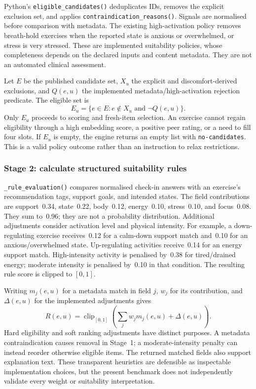 Python's \texttt{eligible\_candidates()} deduplicates IDs, removes the explicit exclusion set, and applies \texttt{contraindication\_reasons()}. Signals are normalised before comparison with metadata. The existing high-activation policy removes breath-hold exercises when the reported state is anxious or overwhelmed, or stress is very stressed. These are implemented suitability policies, whose completeness depends on the declared inputs and content metadata. They are not an automated clinical assessment.

Let $E$ be the published candidate set, $X_u$ the explicit and discomfort-derived exclusions, and $Q(e,u)$ the implemented metadata/high-activation rejection predicate. The eligible set is
\begin{equation}
 E_u = \{e\in E: e\notin X_u \text{ and } \neg Q(e,u)\}.
 \label{eq:eligibility}
\end{equation}
Only $E_u$ proceeds to scoring and fresh-item selection. An exercise cannot regain eligibility through a high embedding score, a positive peer rating, or a need to fill four slots. If $E_u$ is empty, the engine returns an empty list with \texttt{no-candidates}. This is a valid policy outcome rather than an instruction to relax restrictions.

\subsubsection{Stage 2: calculate structured suitability rules}
\label{sec:stage-two}

\texttt{\_rule\_evaluation()} compares normalised check-in answers with an exercise's recommendation tags, support goals, and intended states. The field contributions are support~0.34, state~0.22, body~0.12, energy~0.10, stress~0.10, and focus~0.08. They sum to~0.96; they are not a probability distribution. Additional adjustments consider activation level and physical intensity. For example, a down-regulating exercise receives~0.12 for a calm-down support match and~0.10 for an anxious/overwhelmed state. Up-regulating activities receive~0.14 for an energy support match. High-intensity activity is penalised by~0.38 for tired/drained energy; moderate intensity is penalised by~0.10 in that condition. The resulting rule score is clipped to $[0,1]$.

Writing $m_j(e,u)$ for a metadata match in field $j$, $w_j$ for its contribution, and $\Delta(e,u)$ for the implemented adjustments gives
\begin{equation}
 R(e,u)=\operatorname{clip}_{[0,1]}\!\left(\sum_j w_jm_j(e,u)+\Delta(e,u)\right).
 \label{eq:rule-score}
\end{equation}
Hard eligibility and soft ranking adjustments have distinct purposes. A metadata contraindication causes removal in Stage~1; a moderate-intensity penalty can instead reorder otherwise eligible items. The returned matched fields also support explanation text. These transparent heuristics are defensible as inspectable implementation choices, but the present benchmark does not independently validate every weight or suitability interpretation.

